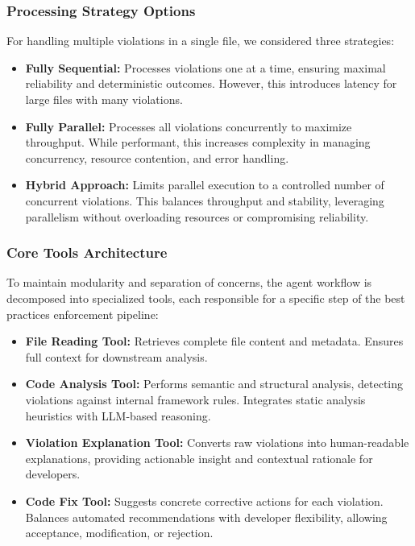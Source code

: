 \begin{spacing}{1.2}
\subsubsection{Processing Strategy Options}
For handling multiple violations in a single file, we considered three strategies:

\begin{itemize}
    \item \textbf{Fully Sequential:} Processes violations one at a time, ensuring maximal reliability and deterministic outcomes. However, this introduces latency for large files with many violations.
    
    \item \textbf{Fully Parallel:} Processes all violations concurrently to maximize throughput. While performant, this increases complexity in managing concurrency, resource contention, and error handling.
    
    \item \textbf{Hybrid Approach:} Limits parallel execution to a controlled number of concurrent violations. This balances throughput and stability, leveraging parallelism without overloading resources or compromising reliability.
\end{itemize}

\subsubsection{Core Tools Architecture}
To maintain modularity and separation of concerns, the agent workflow is decomposed into specialized tools, each responsible for a specific step of the best practices enforcement pipeline:

\begin{itemize}
    \item \textbf{File Reading Tool:} Retrieves complete file content and metadata. Ensures full context for downstream analysis.
    
    \item \textbf{Code Analysis Tool:} Performs semantic and structural analysis, detecting violations against internal framework rules. Integrates static analysis heuristics with LLM-based reasoning.
    
    \item \textbf{Violation Explanation Tool:} Converts raw violations into human-readable explanations, providing actionable insight and contextual rationale for developers.
    
    \item \textbf{Code Fix Tool:} Suggests concrete corrective actions for each violation. Balances automated recommendations with developer flexibility, allowing acceptance, modification, or rejection.
    

\end{itemize}
\end{spacing}
